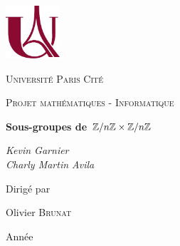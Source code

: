 \documentclass[12pt,a4paper]{report}
\begin{document}
\begin{titlepage}
	\centering
	\includegraphics[width=0.15\textwidth]{logo_upc_small.pdf}\par\vspace{1cm}
	{\textsc{Université Paris Cité} \par}
	\vfill
	{\Large \textsc{Projet mathématiques - Informatique}\par}
	\vspace{1.5cm}
	{\huge\bfseries Sous-groupes de $\mathbb Z/n\mathbb Z \times \mathbb Z/n\mathbb Z$\par}
	\vspace{2cm}
	{\Large\itshape Kevin Garnier \\
	Charly Martin Avila\par}
	\vfill
	Dirigé par\par
	Olivier \textsc{Brunat}

	\vfill

	{\large Année \the\year \par}
\end{titlepage}
\end{document}
